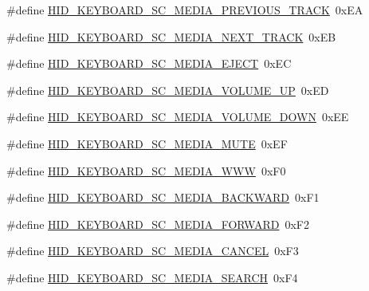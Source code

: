 \begin{DoxyCompactItemize}
\#define \hyperlink{group__Group__USBClassHIDCommon_gaa9f052009afd7ed6f05df26b9a20d034}{H\+I\+D\+\_\+\+K\+E\+Y\+B\+O\+A\+R\+D\+\_\+\+S\+C\+\_\+\+M\+E\+D\+I\+A\+\_\+\+P\+R\+E\+V\+I\+O\+U\+S\+\_\+\+T\+R\+A\+CK}~0x\+EA
\item 
\#define \hyperlink{group__Group__USBClassHIDCommon_ga53f5a525ec90b15210d93a4e0895c110}{H\+I\+D\+\_\+\+K\+E\+Y\+B\+O\+A\+R\+D\+\_\+\+S\+C\+\_\+\+M\+E\+D\+I\+A\+\_\+\+N\+E\+X\+T\+\_\+\+T\+R\+A\+CK}~0x\+EB
\item 
\#define \hyperlink{group__Group__USBClassHIDCommon_ga08dfccd66f0cfc929e787f0e24661c54}{H\+I\+D\+\_\+\+K\+E\+Y\+B\+O\+A\+R\+D\+\_\+\+S\+C\+\_\+\+M\+E\+D\+I\+A\+\_\+\+E\+J\+E\+CT}~0x\+EC
\item 
\#define \hyperlink{group__Group__USBClassHIDCommon_gacc01b88fe7f82689bda80aa3f8c9955f}{H\+I\+D\+\_\+\+K\+E\+Y\+B\+O\+A\+R\+D\+\_\+\+S\+C\+\_\+\+M\+E\+D\+I\+A\+\_\+\+V\+O\+L\+U\+M\+E\+\_\+\+UP}~0x\+ED
\item 
\#define \hyperlink{group__Group__USBClassHIDCommon_ga2c50840660a56dbd526b6d2d3928f461}{H\+I\+D\+\_\+\+K\+E\+Y\+B\+O\+A\+R\+D\+\_\+\+S\+C\+\_\+\+M\+E\+D\+I\+A\+\_\+\+V\+O\+L\+U\+M\+E\+\_\+\+D\+O\+WN}~0x\+EE
\item 
\#define \hyperlink{group__Group__USBClassHIDCommon_ga8023bed237641d413730756c1504e15a}{H\+I\+D\+\_\+\+K\+E\+Y\+B\+O\+A\+R\+D\+\_\+\+S\+C\+\_\+\+M\+E\+D\+I\+A\+\_\+\+M\+U\+TE}~0x\+EF
\item 
\#define \hyperlink{group__Group__USBClassHIDCommon_gacc25bb8f867bcb460a3aaabceb2fbd93}{H\+I\+D\+\_\+\+K\+E\+Y\+B\+O\+A\+R\+D\+\_\+\+S\+C\+\_\+\+M\+E\+D\+I\+A\+\_\+\+W\+WW}~0x\+F0
\item 
\#define \hyperlink{group__Group__USBClassHIDCommon_gadd551512b80145ee0f3ac723532502b6}{H\+I\+D\+\_\+\+K\+E\+Y\+B\+O\+A\+R\+D\+\_\+\+S\+C\+\_\+\+M\+E\+D\+I\+A\+\_\+\+B\+A\+C\+K\+W\+A\+RD}~0x\+F1
\item 
\#define \hyperlink{group__Group__USBClassHIDCommon_ga2b9c494dfdf6d978983069e63e634b04}{H\+I\+D\+\_\+\+K\+E\+Y\+B\+O\+A\+R\+D\+\_\+\+S\+C\+\_\+\+M\+E\+D\+I\+A\+\_\+\+F\+O\+R\+W\+A\+RD}~0x\+F2
\item 
\#define \hyperlink{group__Group__USBClassHIDCommon_ga350bb6b2961a461b763455b4293fef25}{H\+I\+D\+\_\+\+K\+E\+Y\+B\+O\+A\+R\+D\+\_\+\+S\+C\+\_\+\+M\+E\+D\+I\+A\+\_\+\+C\+A\+N\+C\+EL}~0x\+F3
\item 
\#define \hyperlink{group__Group__USBClassHIDCommon_ga87d9d2a4ec2beca759d67d5faa8a73ea}{H\+I\+D\+\_\+\+K\+E\+Y\+B\+O\+A\+R\+D\+\_\+\+S\+C\+\_\+\+M\+E\+D\+I\+A\+\_\+\+S\+E\+A\+R\+CH}~0x\+F4

\end{DoxyCompactItemize}
